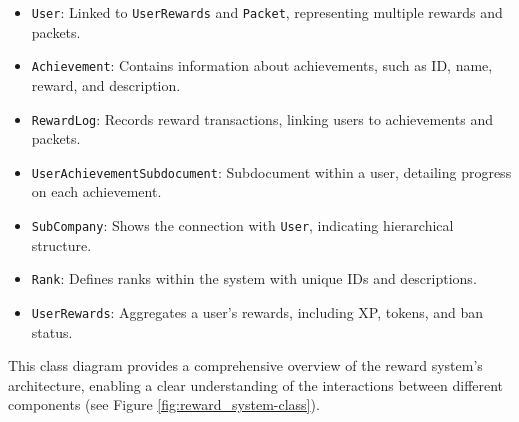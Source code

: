\begin{itemize}
    \item \texttt{User}: Linked to \texttt{UserRewards} and \texttt{Packet}, representing multiple rewards and packets.
    \item \texttt{Achievement}: Contains information about achievements, such as ID, name, reward, and description.
    \item \texttt{RewardLog}: Records reward transactions, linking users to achievements and packets.
    \item \texttt{UserAchievementSubdocument}: Subdocument within a user, detailing progress on each achievement.
    \item \texttt{SubCompany}: Shows the connection with \texttt{User}, indicating hierarchical structure.
    \item \texttt{Rank}: Defines ranks within the system with unique IDs and descriptions.
    \item \texttt{UserRewards}: Aggregates a user's rewards, including XP, tokens, and ban status.
\end{itemize}

This class diagram provides a comprehensive overview of the reward system's architecture, enabling a clear understanding of the interactions between different components (see Figure \ref{fig:reward_system-class}).

